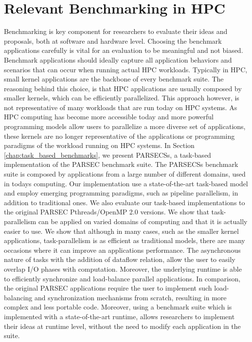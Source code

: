 \section{Relevant Benchmarking in HPC}
Benchmarking is key component for researchers to evaluate their ideas and proposals, both
at software and hardware level.  Choosing the benchmark applications carefully is vital
for an evaluation to be meaningful and not biased. Benchmark applications should ideally
capture all application behaviors and scenarios that can occur when running actual HPC
workloads.  Typically in HPC, small kernel applications are the backbone of every
benchmark suite.  The reasoning behind this choice, is that HPC applications are usually
composed by smaller kernels, which can be efficiently parallelized.  This approach
however, is not representative of many workloads that are run today on HPC systems.  As
HPC computing has become more accessible today and more powerful programming models allow
users to parallelize a more diverse set of applications, these kernels are no longer
representative of the applications or programming paradigms of the workload running on HPC
systems.  In Section \ref{chap:task_based_benchmarks}, we present PARSECSs, a task-based
implementation of the PARSEC benchmark suite.  The PARSECSs benchmark suite is composed by
applications from a large number of different domains, used in todays computing.  Our
implementation use a state-of-the-art task-based model and employ emerging programming
paradigms, such as pipeline parallelism, in addition to traditional ones.  We also
evaluate our task-based implementations to the original PARSEC Pthreads/OpenMP 2.0
versions.  We show that task-parallelism can be applied on varied domains of computing and
that it is actually easier to use.  We show that although in many cases, such as the
smaller kernel applications, task-parallelism is as efficient as traditional models, there
are many occasions where it can improve an applications performance.  The asynchronous
nature of tasks with the addition of dataflow relation, allow the user to easily overlap
I/O phases with computation.  Moreover, the underlying runtime is able to efficiently
synchronize and load-balance parallel applications.  In comparison, the original PARSEC
applications require the user to implement such load-balancing and synchronization
mechanisms from scratch, resulting in more complex and less portable code.  Moreover,
using a benchmark suite which is implemented with a state-of-the-art runtime, allows
researchers to implement their ideas at runtime level, without the need to modify each
application in the suite.

